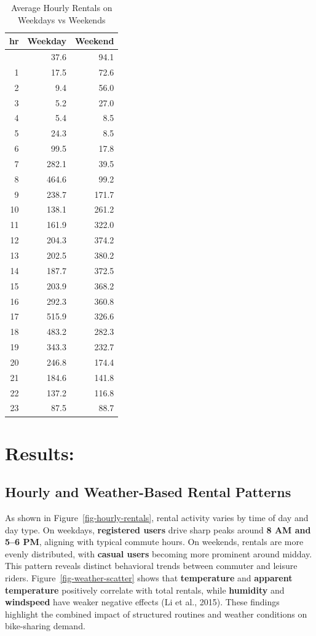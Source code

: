 \documentclass[
  12pt,
]{article}
\begin{document}
\begin{longtable}[]{@{}rrr@{}}

\caption{\label{tbl-hourly-weektype}Average Hourly Rentals on Weekdays
vs Weekends}

\tabularnewline

\toprule\noalign{}
hr & Weekday & Weekend \\
\midrule\noalign{}
\endhead
\bottomrule\noalign{}
\endlastfoot
0 & 37.6 & 94.1 \\
1 & 17.5 & 72.6 \\
2 & 9.4 & 56.0 \\
3 & 5.2 & 27.0 \\
4 & 5.4 & 8.5 \\
5 & 24.3 & 8.5 \\
6 & 99.5 & 17.8 \\
7 & 282.1 & 39.5 \\
8 & 464.6 & 99.2 \\
9 & 238.7 & 171.7 \\
10 & 138.1 & 261.2 \\
11 & 161.9 & 322.0 \\
12 & 204.3 & 374.2 \\
13 & 202.5 & 380.2 \\
14 & 187.7 & 372.5 \\
15 & 203.9 & 368.2 \\
16 & 292.3 & 360.8 \\
17 & 515.9 & 326.6 \\
18 & 483.2 & 282.3 \\
19 & 343.3 & 232.7 \\
20 & 246.8 & 174.4 \\
21 & 184.6 & 141.8 \\
22 & 137.2 & 116.8 \\
23 & 87.5 & 88.7 \\

\end{longtable}

\section{Results:}\label{results}

\subsection{Hourly and Weather-Based Rental
Patterns}\label{hourly-and-weather-based-rental-patterns}

As shown in Figure~\ref{fig-hourly-rentals}, rental activity varies by
time of day and day type. On weekdays, \textbf{registered users} drive
sharp peaks around \textbf{8 AM and 5--6 PM}, aligning with typical
commute hours. On weekends, rentals are more evenly distributed, with
\textbf{casual users} becoming more prominent around midday. This
pattern reveals distinct behavioral trends between commuter and leisure
riders. Figure~\ref{fig-weather-scatter} shows that \textbf{temperature}
and \textbf{apparent temperature} positively correlate with total
rentals, while \textbf{humidity} and \textbf{windspeed} have weaker
negative effects (Li et al., 2015). These findings highlight the
combined impact of structured routines and weather conditions on
bike-sharing demand.
\end{document}
